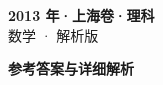 \documentclass[zihao=-4, a4paper]{ctexart}
\begin{document}
\begin{center}
  {\Large\bfseries 2013 年·上海卷·理科}\\[4pt]
  {\large 数学 · 解析版}
\end{center}
\medskip
{}

\clearpage
{}
\begin{center}{\Large\bfseries 参考答案与详细解析}\end{center}
\medskip

\end{document}
